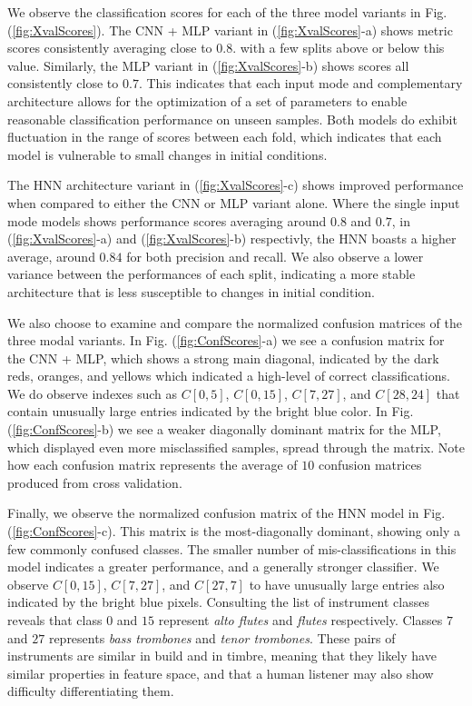 \documentclass[conference,onecolumn,letterpaper]{IEEEtran}
\begin{document}
We observe the classification scores for each of the three model variants in Fig. (\ref{fig:XvalScores}). The CNN + MLP variant in (\ref{fig:XvalScores}-a) shows metric scores consistently averaging close to $0.8$. with a few splits above or below this value. Similarly, the MLP variant in (\ref{fig:XvalScores}-b) shows scores all consistently close to $0.7$.  This indicates that each input mode and complementary architecture allows for the optimization of a set of parameters to enable reasonable classification performance on unseen samples. Both models do exhibit fluctuation in the range of scores between each fold, which indicates that each model is vulnerable to small changes in initial conditions. 

The HNN architecture variant in (\ref{fig:XvalScores}-c) shows improved performance when compared to either the CNN or MLP variant alone. Where the single input mode models shows performance scores averaging around $0.8$ and $0.7$, in (\ref{fig:XvalScores}-a) and (\ref{fig:XvalScores}-b) respectivly, the HNN boasts a higher average, around $0.84$ for both precision and recall. We also observe a lower variance between the performances of each split, indicating a more stable architecture that is less susceptible to changes in initial condition. 

We also choose to examine and compare the normalized confusion matrices of the three modal variants. In Fig. (\ref{fig:ConfScores}-a) we see a confusion matrix for the CNN + MLP, which shows a strong main diagonal, indicated by the dark reds, oranges, and yellows which indicated a high-level of correct classifications. We do observe indexes such as $C[0,5]$, $C[0,15]$, $C[7,27]$, and $C[28,24]$ that contain unusually large entries indicated by the bright blue color. In Fig. (\ref{fig:ConfScores}-b) we see a weaker diagonally dominant matrix for the MLP, which displayed even more misclassified samples, spread through the matrix. Note how each confusion matrix represents the average of $10$ confusion matrices produced from cross validation. 

Finally, we observe the normalized confusion matrix of the HNN model in Fig. (\ref{fig:ConfScores}-c). This matrix is the most-diagonally dominant, showing only a few commonly confused classes. The smaller number of mis-classifications in this model indicates a greater performance, and a generally stronger classifier. We observe $C[0,15]$, $C[7,27]$, and $C[27,7]$ to have unusually large entries also indicated by the bright blue pixels. Consulting the list of instrument classes reveals that class $0$ and $15$ represent \textit{alto flutes} and \textit{flutes} respectively.  Classes $7$ and $27$ represents \textit{bass trombones} and \textit{tenor trombones}. These pairs of instruments are similar in build and in timbre, meaning that they likely have similar properties in feature space, and that a human listener may also show difficulty differentiating them. 
\end{document}
